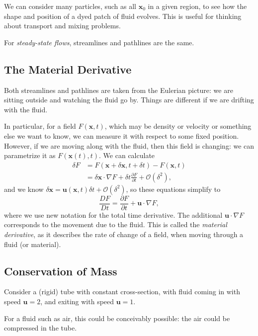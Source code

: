 \documentclass[12pt]{article}
\begin{document}
We can consider many particles, such as all $\mathbf{x}_0$ in a given region, to see how the shape and position of a dyed patch of fluid evolves. This is useful for thinking about transport and mixing problems.

For \emph{steady-state flows}, streamlines and pathlines are the same.

\subsection{The Material Derivative}
\label{sub:the_material_derivative}

Both streamlines and pathlines are taken from the Eulerian picture: we are sitting outside and watching the fluid go by. Things are different if we are drifting with the fluid.

In particular, for a field $F(\mathbf{x},t)$, which may be density or velocity or something else we want to know, we can measure it with respect to some fixed position. However, if we are moving along with the fluid, then this field is changing: we can parametrize it as $F(\mathbf{x}(t), t)$. We can calculate
\begin{align*}
	\delta F &= F(\mathbf{x} + \delta \mathbf{x}, t + \delta t) - F(\mathbf{x}, t) \\
		 &= \delta \mathbf{x} \cdot \nabla F + \delta t \frac{\partial F}{\partial t} + \mathcal{O}(\delta^2),
\end{align*}
and we know $\delta \mathbf{x} = \mathbf{u}(\mathbf{x},t) \delta t + \mathcal{O}(\delta^2)$, so these equations simplify to
\[
\frac{DF}{Dt} = \frac{\partial F}{\partial t} + \mathbf{u} \cdot \nabla F
,\]
where we use new notation for the total time derivative. The additional $\mathbf{u} \cdot \nabla F$ corresponds to the movement due to the fluid. This is called the \emph{material derivative}, as it describes the rate of change of a field, when moving through a fluid (or material).

\subsection{Conservation of Mass}
\label{sub:conservation_of_mass}

Consider a (rigid) tube with constant cross-section, with fluid coming in with speed $\mathbf{u} = 2$, and exiting with speed $\mathbf{u} = 1$.

For a fluid such as air, this could be conceivably possible: the air could be compressed in the tube.
\end{document}
